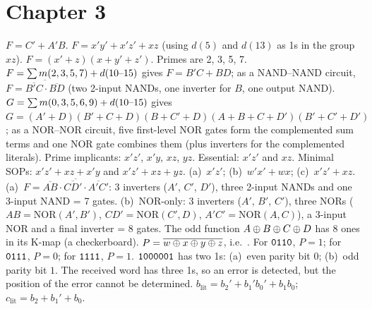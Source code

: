 \section*{Chapter 3}
 $F=C'+A'B$.
 $F=x'y'+x'z'+xz$ (using $d(5)$ and $d(13)$ as 1s in the group $xz$).
 $F=(x'+z)(x+y'+z')$.
 Primes are 2, 3, 5, 7. $F=\sum m(2,3,5,7)+d(10\text{--}15)$ gives $F=B'C+BD$; as a NAND--NAND circuit, $F=\overline{\overline{B'C}\cdot\overline{BD}}$ (two 2-input NANDs, one inverter for $B$, one output NAND). $G=\sum m(0,3,5,6,9)+d(10\text{--}15)$ gives $G=(A'+D)(B'+C+D)(B+C'+D)(A+B+C+D')(B'+C'+D')$; as a NOR--NOR circuit, five first-level NOR gates form the complemented sum terms and one NOR gate combines them (plus inverters for the complemented literals).
 Prime implicants: $x'z'$, $x'y$, $xz$, $yz$. Essential: $x'z'$ and $xz$. Minimal SOPs: $x'z'+xz+x'y$ and $x'z'+xz+yz$.
 (a)~$x'z'$; (b)~$w'x'+wx$; (c)~$x'z'+xz$.
 (a)~$F=\overline{\overline{AB}\cdot\overline{CD'}\cdot\overline{A'C'}}$: 3 inverters ($A'$, $C'$, $D'$), three 2-input NANDs and one 3-input NAND = 7 gates. (b)~NOR-only: 3 inverters ($A'$, $B'$, $C'$), three NORs ($AB=\mathrm{NOR}(A',B')$, $CD'=\mathrm{NOR}(C',D)$, $A'C'=\mathrm{NOR}(A,C)$), a 3-input NOR and a final inverter = 8 gates.
 The odd function $A\oplus B\oplus C\oplus D$ has 8 ones in its K-map (a checkerboard).
 $P=\overline{w\oplus x\oplus y\oplus z}$, i.e.\ . For $\mathtt{0110}$, $P=1$; for $\mathtt{0111}$, $P=0$; for $\mathtt{1111}$, $P=1$.
 $\mathtt{1000001}$ has two 1s: (a)~even parity bit $0$; (b)~odd parity bit $1$. The received word has three 1s, so an error is detected, but the position of the error cannot be determined.
 $b_{\mathrm{lit}}=b_2'+b_1'b_0'+b_1b_0$; $c_{\mathrm{lit}}=b_2+b_1'+b_0$.

